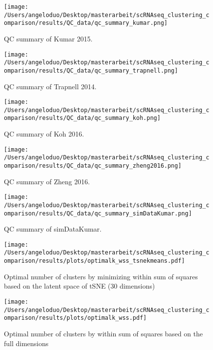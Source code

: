 \documentclass[12pt, a4paper]{article}\usepackage[]{graphicx}\usepackage[]{color}
\begin{document}
\begin{figure}[!h]
\texttt{[image: /Users/angeloduo/Desktop/masterarbeit/scRNAseq\_clustering\_comparison/results/QC\_data/qc\_summary\_kumar.png]}
\caption{QC summary of Kumar 2015. }
\label{fig:qckumar}
\end{figure}

\begin{figure}[!h]
\texttt{[image: /Users/angeloduo/Desktop/masterarbeit/scRNAseq\_clustering\_comparison/results/QC\_data/qc\_summary\_trapnell.png]}
\caption{QC summary of Trapnell 2014. }
\label{fig:qctrapnell}
\end{figure}

\begin{figure}[!h]
\texttt{[image: /Users/angeloduo/Desktop/masterarbeit/scRNAseq\_clustering\_comparison/results/QC\_data/qc\_summary\_koh.png]}
\caption{QC summary of Koh 2016. }
\label{fig:qckoh}
\end{figure}

\begin{figure}[!h]
\texttt{[image: /Users/angeloduo/Desktop/masterarbeit/scRNAseq\_clustering\_comparison/results/QC\_data/qc\_summary\_zheng2016.png]}
\caption{QC summary of Zheng 2016. }
\label{fig:qczheng}
\end{figure}

\begin{figure}[!h]
\texttt{[image: /Users/angeloduo/Desktop/masterarbeit/scRNAseq\_clustering\_comparison/results/QC\_data/qc\_summary\_simDataKumar.png]}
\caption{QC summary of simDataKumar. }
\label{fig:simDataKumar}
\end{figure}

\begin{figure}[!h]
\texttt{[image: /Users/angeloduo/Desktop/masterarbeit/scRNAseq\_clustering\_comparison/results/plots/optimalk\_wss\_tsnekmeans.pdf]}
\caption{Optimal number of clusters by minimizing within sum of squares based on the latent space of tSNE (30 dimensions) }
\label{fig:wsstsne}
\end{figure}

\begin{figure}[!h]
\texttt{[image: /Users/angeloduo/Desktop/masterarbeit/scRNAseq\_clustering\_comparison/results/plots/optimalk\_wss.pdf]}
\caption{Optimal number of clusters by within sum of squares based on the full dimensions }
\label{fig:wssorg}
\end{figure}
\end{document}
